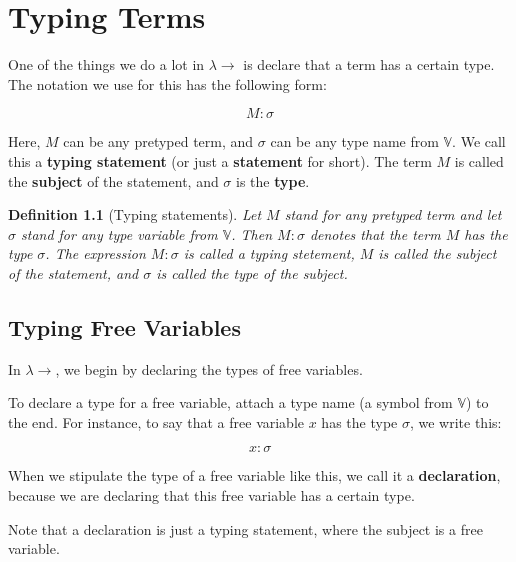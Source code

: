 \documentclass{book}
\numberwithin{equation}{chapter}
\newcommand{\vocab}{\textbf}
\newtheorem{definition}{Definition}
\begin{document}
\chapter{Typing Terms}

One of the things we do a lot in $\lambda\rightarrow$ is declare that a term has a certain type. The notation we use for this has the following form:

\begin{equation}
M : \sigma
\end{equation}

\noindent
Here, $M$ can be any pretyped term, and $\sigma$ can be any type name from $\mathbb{V}$. We call this a \vocab{typing statement} (or just a \vocab{statement} for short). The term $M$ is called the \vocab{subject} of the statement, and $\sigma$ is the \vocab{type}.


\begin{definition}[Typing statements]
Let $M$ stand for any pretyped term and let $\sigma$ stand for any type variable from $\mathbb{V}$. Then $M : \sigma$ denotes that the term $M$ has the type $\sigma$. The expression $M : \sigma$ is called a typing stetement, $M$ is called the subject of the statement, and $\sigma$ is called the type of the subject.
\end{definition}



\section{Typing Free Variables}

In $\lambda\rightarrow$, we begin by declaring the types of free variables.

To declare a type for a free variable, attach a type name (a symbol from $\mathbb{V}$) to the end. For instance, to say that a free variable $x$ has the type $\sigma$, we write this:

\begin{equation}
x : \sigma
\end{equation}

\noindent
When we stipulate the type of a free variable like this, we call it a \vocab{declaration}, because we are declaring that this free variable has a certain type.

Note that a declaration is just a typing statement, where the subject is a free variable.
\end{document}
